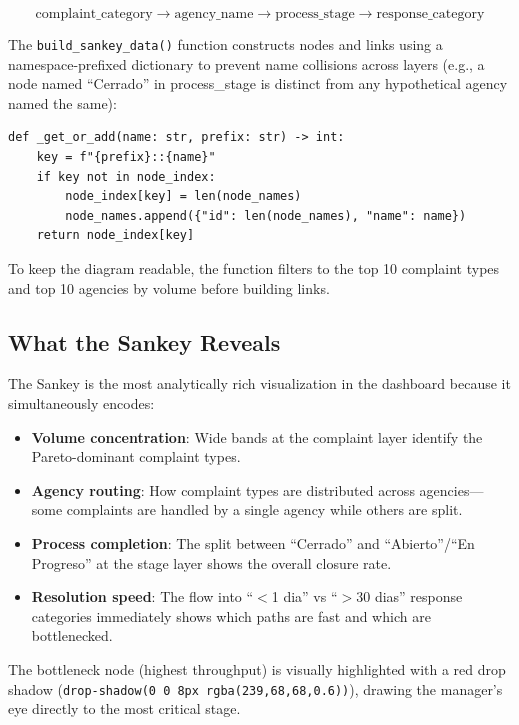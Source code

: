 \[
\text{complaint\_category} \longrightarrow \text{agency\_name} \longrightarrow \text{process\_stage} \longrightarrow \text{response\_category}
\]

The \texttt{build\_sankey\_data()} function constructs nodes and links using a namespace-prefixed dictionary to prevent name collisions across layers (e.g., a node named ``Cerrado'' in process\_stage is distinct from any hypothetical agency named the same):

\begin{lstlisting}[style=python, caption={Namespace-prefixed node registry in \texttt{ops\_engine.py}}, label=lst:sankey-nodes]
def _get_or_add(name: str, prefix: str) -> int:
    key = f"{prefix}::{name}"
    if key not in node_index:
        node_index[key] = len(node_names)
        node_names.append({"id": len(node_names), "name": name})
    return node_index[key]
\end{lstlisting}

To keep the diagram readable, the function filters to the top 10 complaint types and top 10 agencies by volume before building links.

\subsection{What the Sankey Reveals}

The Sankey is the most analytically rich visualization in the dashboard because it simultaneously encodes:

\begin{itemize}
  \item \textbf{Volume concentration}: Wide bands at the complaint layer identify the Pareto-dominant complaint types.
  \item \textbf{Agency routing}: How complaint types are distributed across agencies---some complaints are handled by a single agency while others are split.
  \item \textbf{Process completion}: The split between ``Cerrado'' and ``Abierto''/``En Progreso'' at the stage layer shows the overall closure rate.
  \item \textbf{Resolution speed}: The flow into ``$<$1 dia'' vs ``$>$30 dias'' response categories immediately shows which paths are fast and which are bottlenecked.
\end{itemize}

The bottleneck node (highest throughput) is visually highlighted with a red drop shadow (\texttt{drop-shadow(0 0 8px rgba(239,68,68,0.6))}), drawing the manager's eye directly to the most critical stage.

